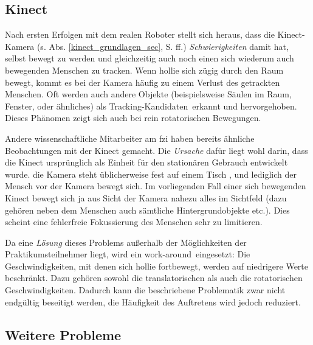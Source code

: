 \subsection{Kinect}
\label{test_kinect}

Nach ersten Erfolgen mit dem realen Roboter stellt sich heraus, dass die Kinect-Kamera (s. Abs. \ref{kinect_grundlagen_sec}, S. \pageref{kinect_grundlagen_sec} ff.) \emph{Schwierigkeiten} damit hat, selbst bewegt zu werden und gleichzeitig auch noch einen sich wiederum auch bewegenden Menschen zu tracken.
Wenn \gls{hollie} sich zügig durch den Raum bewegt, kommt es bei der Kamera häufig zu einem Verlust des getrackten Menschen.
Oft werden auch andere Objekte (beispielsweise Säulen im Raum, Fenster, oder ähnliches) als \glqq Tracking-Kandidaten\grqq\ erkannt und hervorgehoben.
Dieses Phänomen zeigt sich auch bei rein rotatorischen Bewegungen.

Andere wissenschaftliche Mitarbeiter am \gls{fzi} haben bereits ähnliche Beobachtungen mit der Kinect gemacht.
Die \emph{Ursache} dafür liegt wohl darin, dass die Kinect ursprünglich als Einheit für den stationären Gebrauch entwickelt wurde.
\Dh die Kamera steht üblicherweise fest auf einem Tisch \oae, und lediglich der Mensch vor der Kamera bewegt sich.
Im vorliegenden Fall einer sich bewegenden Kinect bewegt sich ja aus Sicht der Kamera nahezu alles im Sichtfeld (dazu gehören neben dem Menschen auch sämtliche Hintergrundobjekte etc.).
Dies scheint eine fehlerfreie Fokussierung des Menschen sehr zu limitieren.

Da eine \emph{Lösung} dieses Problems außerhalb der Möglichkeiten der Praktikumsteilnehmer liegt, wird ein \glqq work-around\grqq\ eingesetzt:
Die Geschwindigkeiten, mit denen sich \gls{hollie} fortbewegt, werden auf niedrigere Werte beschränkt.
Dazu gehören sowohl die translatorischen als auch die rotatorischen Geschwindigkeiten.
Dadurch kann die beschriebene Problematik zwar nicht endgültig beseitigt werden, die Häufigkeit des Auftretens wird jedoch reduziert.




\subsection{Weitere Probleme}

